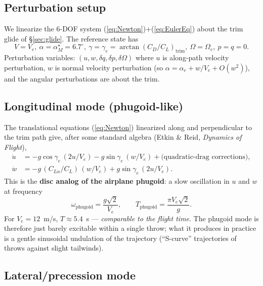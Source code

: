 \documentclass[11pt,letterpaper]{article}
\begin{document}
\subsection{Perturbation setup}

We linearize the 6-DOF system (\ref{eq:Newton})+(\ref{eq:EulerEq}) about the trim glide of \S\ref{sec:glide}. The reference state has
\begin{equation}
V = V_e,\ \alpha = \alpha_M^\star = 6.7^\circ,\ \gamma = \gamma_e = \arctan(C_D/C_L)_{\text{trim}},\ \Omega = \Omega_e,\ p = q = 0.
\end{equation}
Perturbation variables: $(u, w, \delta q, \delta p, \delta\Omega)$ where $u$ is along-path velocity perturbation, $w$ is normal velocity perturbation (so $\alpha = \alpha_e + w/V_e + O(w^2)$), and the angular perturbations are about the trim.

\subsection{Longitudinal mode (phugoid-like)}

The translational equations (\ref{eq:Newton}) linearized along and perpendicular to the trim path give, after some standard algebra (Etkin \& Reid, \emph{Dynamics of Flight}),
\begin{align}
\dot{u} &= -g\cos\gamma_e\,(2 u/V_e) - g\sin\gamma_e\,(w/V_e) + \text{(quadratic-drag corrections)},\\
\dot{w} &= -g\,(C_{L\alpha}/C_L)\,(w/V_e) + g\sin\gamma_e\,(2 u/V_e).
\end{align}
This is the \textbf{disc analog of the airplane phugoid}: a slow oscillation in $u$ and $w$ at frequency
\begin{equation}
\omega_{\text{phugoid}} = \frac{g\sqrt{2}}{V_e}, \qquad T_{\text{phugoid}} = \frac{\pi V_e \sqrt{2}}{g}.
\label{eq:phug}
\end{equation}
For $V_e = 12$~m/s, $T \approx 5.4$~s --- \emph{comparable to the flight time}. The phugoid mode is therefore just barely excitable within a single throw; what it produces in practice is a gentle sinusoidal undulation of the trajectory (``S-curve'' trajectories of throws against slight tailwinds).

\subsection{Lateral/precession mode}
\end{document}
